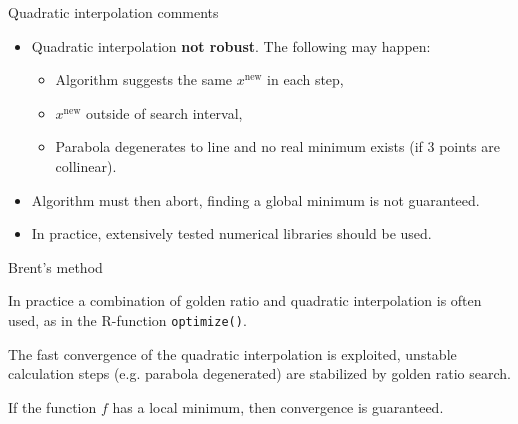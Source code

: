 \documentclass[11pt,compress,t,notes=noshow, xcolor=table]{beamer}
\begin{document}
\begin{vbframe}{Quadratic interpolation comments}
\begin{itemize}
\item Quadratic interpolation \textbf{not robust}. The following may happen:
\begin{itemize}
\item Algorithm suggests the same $x^{\text{new}}$ in each step,
\item $x^{\text{new}}$ outside of search interval,
\item Parabola degenerates to line and no real minimum exists (if 3 points are collinear).
\end{itemize}
\item Algorithm must then abort, finding a global minimum is not guaranteed.
\item In practice, extensively tested numerical libraries should be used.
\end{itemize}
\end{vbframe}

\begin{vbframe}{Brent's method}

In practice a combination of golden ratio and quadratic interpolation is often used, as in the R-function \texttt{optimize()}.

\lz

The fast convergence of the quadratic interpolation is exploited, unstable calculation steps (e.g. parabola degenerated) are stabilized by golden ratio search.

\lz

If the function $f$ has a local minimum, then convergence is guaranteed. 

\end{vbframe}
\end{document}
